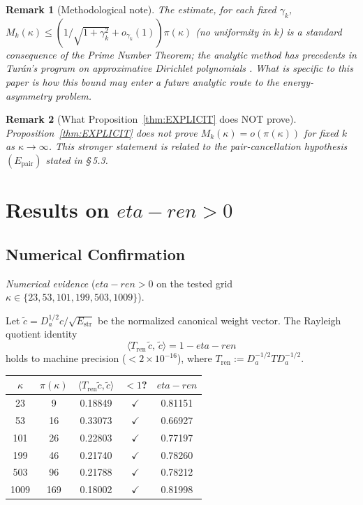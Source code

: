 \documentclass[11pt]{article}
\def\etaren{eta-ren}%
\newtheorem*{remark}{Remark}
\newcommand{\Estr}{E_{\mathrm{str}}}
\newcommand{\etaren}{\eta_{\mathrm{ren}}}
\newcommand{\Tren}{T_{\mathrm{ren}}}
\newcommand{\Da}{D_a}
\begin{document}
\begin{remark}[Methodological note]
The estimate, for each fixed $\gamma_k$,
$M_k(\kappa)\le(1/\sqrt{1+\gamma_k^2}+o_{\gamma_k}(1))\pi(\kappa)$
(no uniformity in $k$) is a standard consequence of the Prime Number Theorem; the
analytic method has precedents in Tur\'an's program on
approximative Dirichlet polynomials \cite{Turan}.
What is specific to this paper is how this bound may enter
a future analytic route to the energy-asymmetry problem.
\end{remark}

\begin{remark}[What Proposition~\ref{thm:EXPLICIT} does NOT prove]
Proposition~\ref{thm:EXPLICIT} does not prove
$M_k(\kappa) = o(\pi(\kappa))$ for \emph{fixed} $k$ as $\kappa\to\infty$.
This stronger statement is related to the pair-cancellation
hypothesis $(E_{\mathrm{pair}})$ stated in \S\,5.3.
\end{remark}

\section{Results on $\etaren > 0$}

\subsection{Numerical Confirmation}

\emph{Numerical evidence} ($\etaren > 0$ on the tested grid $\kappa\in\{23,53,101,199,503,1009\}$).

Let $\tilde{c} = \Da^{1/2}c/\sqrt{\Estr}$ be the normalized canonical
weight vector. The Rayleigh quotient identity
\[
\langle\Tren\,\tilde{c},\,\tilde{c}\rangle = 1 - \etaren
\]
holds to machine precision ($< 2\times 10^{-16}$),
where $\Tren := \Da^{-1/2}T\Da^{-1/2}$.

\begin{center}
\begin{tabular}{ccccc}
\toprule
$\kappa$ & $\pi(\kappa)$ & $\langle\Tren\tilde{c},\tilde{c}\rangle$
  & $< 1$? & $\etaren$ \\
\midrule
23   & 9   & 0.18849 & $\checkmark$ & 0.81151 \\
53   & 16  & 0.33073 & $\checkmark$ & 0.66927 \\
101  & 26  & 0.22803 & $\checkmark$ & 0.77197 \\
199  & 46  & 0.21740 & $\checkmark$ & 0.78260 \\
503  & 96  & 0.21788 & $\checkmark$ & 0.78212 \\
1009 & 169 & 0.18002 & $\checkmark$ & 0.81998 \\
\bottomrule
\end{tabular}
\end{center}
\end{document}
